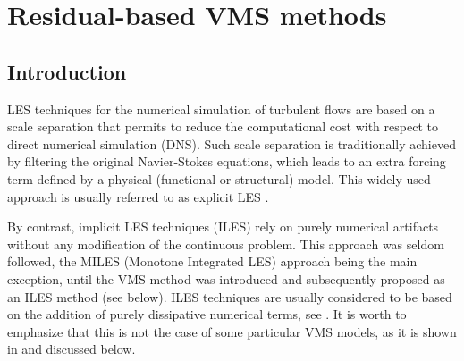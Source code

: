 \chapter{Residual-based VMS methods}
\label{chap-Rb_VMS}
\section{Introduction}
\label{sec-C4_introduction}

LES techniques for the numerical simulation of turbulent flows \cite{Sagaut2006} are based on a scale separation that permits to reduce the computational cost with respect to direct numerical simulation (DNS). Such scale separation is traditionally achieved by filtering the original Navier-Stokes equations, which leads to an extra forcing term defined by a physical (functional or structural) model. This widely used approach is usually referred to as explicit LES \cite{Sagaut2006}.

By contrast, implicit LES techniques (ILES) rely on purely numerical artifacts without any modification of the continuous problem. This approach was seldom followed, the MILES (Monotone Integrated LES) approach \cite{Boris1992,Fureby2002,Grinstein2007} being the main exception, until the VMS method was introduced \cite{hughes_multiscale_1995,hughes_variational_1998} and subsequently proposed as an ILES method (see below). ILES techniques are usually considered to be based on the addition of purely dissipative numerical terms, see  \cite[Section 5.3.4]{Sagaut2006}. It is worth to emphasize that this is not the case of some particular VMS models, as it is shown in \cite{Principe2009} and discussed below.

